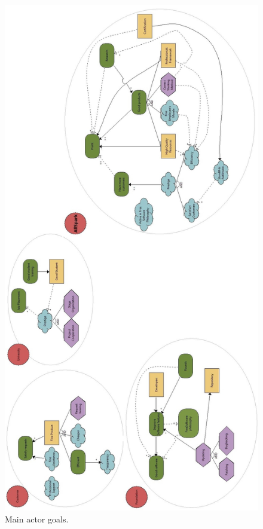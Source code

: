 \begin{figure}
\centering
\includegraphics[scale=0.28]{Si_star/img/internal_goals}
\caption{Main actor goals.}
\label{img:internal_goals}
\end{figure}

